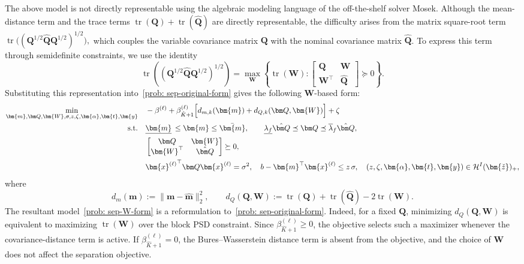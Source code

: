 \documentclass[opre,sglanonrev]{informs4}
\newcommand{\mH}{\mathcal{H}}
\newcommand{\zz}{\check{z}}
\newcommand{\bzz}{\bm{\zz}}
\newcommand{\balpha}{\bm{\alpha}}
\newcommand{\bmean}{\bm{m}}
\newcommand{\bt}{\bm{t}}
\newcommand{\bx}{\bm{x}}
\newcommand{\by}{\bm{y}}
\newcommand{\bQ}{\bm Q}
\newcommand{\bW}{\bm{W}}
\newcommand{\Tr}{\operatorname{tr}}
\begin{document}
{The above model is not directly representable using the algebraic modeling language of the off-the-shelf solver Mosek. Although the mean-distance term and the trace terms \(\Tr(\bQ)+\Tr(\hat{\bQ})\) are directly representable, the difficulty arises from the matrix square-root term $\Tr\!\big(
(\bQ^{1/2}\hat{\bQ}\bQ^{1/2})^{1/2}
\big),$ which couples the variable covariance matrix \(\bQ\) with the nominal covariance matrix \(\hat{\bQ}\). To express this term through semidefinite constraints, we use the identity
\[
\Tr\!\left(
\left(\bQ^{1/2}\hat{\bQ}\bQ^{1/2}\right)^{1/2}
\right)
=
\max_{\bW}
\left\{
\Tr(\bW):
\begin{bmatrix}
\bQ & \bW\\
\bW^\top & \hat{\bQ}
\end{bmatrix}\succeq0
\right\}.
\]
Substituting this representation into~\eqref{prob: sep-original-form} gives the following \(\bW\)-based form:
\begin{equation}
\begin{aligned}
\min_{\bmean,\bQ,\bW,\sigma,z,\zeta,\balpha,\bt,\by}
\quad
&
-\beta^{(\ell)}
+
\beta_{\hat K+1}^{(\ell)}
\Bigl[
d_{m,k}(\bmean)+d_{Q,k}(\bQ,\bW)
\Bigr]
+
\zeta
\\
\mathrm{s.t.}\quad
&
\underline{\bmean} \, \le \bmean\le \bar{\bmean}, \qquad \underline{\lambda_f}\hat{\bQ}\preceq \bQ\preceq \overline{\lambda}_f\hat{\bQ},\\
&
\begin{bmatrix}
\bQ & \bW\\
\bW^\top & \hat{\bQ}
\end{bmatrix}\succeq0,
\\
&
{\bx^{(\ell)}}^\top\bQ\bx^{(\ell)}=\sigma^2, \quad
b-\bmean^\top\bx^{(\ell)}\le z\,\sigma, \quad
(z,\zeta,\balpha,\bt,\by)\in\mH^I(\bzz)_+ ,
\end{aligned}
\label{prob: sep-W-form}
\end{equation}
where\vspace{-1.5em}
\[
d_{m}(\bmean):=\|\bmean-\hat{\bmean}\|_2^2,
\qquad
d_{Q}(\bQ,\bW)
:=
\Tr(\bQ)+\Tr(\hat{\bQ})-2\Tr(\bW).
\]
The resultant model~\eqref{prob: sep-W-form} is a reformulation to~\eqref{prob: sep-original-form}. Indeed, for a fixed \(\bQ\), minimizing \(d_{Q}(\bQ,\bW)\) is equivalent to maximizing \(\Tr(\bW)\) over the block PSD constraint. Since \(\beta_{\hat K+1}^{(\ell)}\ge0\), the objective selects such a maximizer whenever the covariance-distance term is active. If \(\beta_{\hat K+1}^{(\ell)}=0\), the Bures--Wasserstein distance term is absent from the objective, and the choice of \(\bW\) does not affect the separation objective.

}
\end{document}
